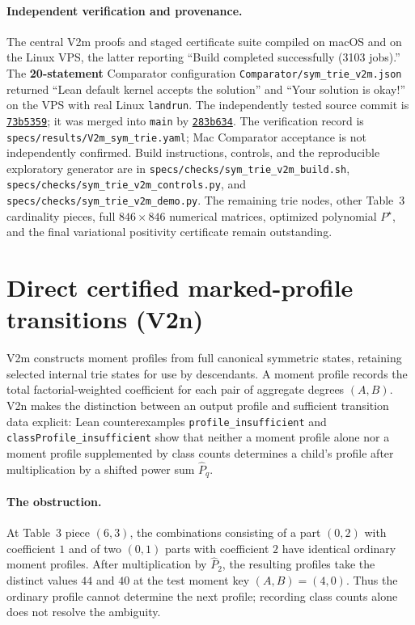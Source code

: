 \documentclass[11pt]{article}
\newcommand{\code}[1]{\texttt{#1}}
\begin{document}
\paragraph{Independent verification and provenance.}
The central V2m proofs and staged certificate suite compiled on macOS and
on the Linux VPS, the latter reporting
``Build completed successfully (3103 jobs).'' The \textbf{20-statement}
Comparator configuration \nolinkurl{Comparator/sym_trie_v2m.json} returned
``Lean default kernel accepts the solution'' and
``Your solution is okay!'' on the VPS with real Linux \code{landrun}.
The independently tested source commit is
\href{https://github.com/thinkthoughts/lean-bgp212/commit/73b5359}{\code{73b5359}};
it was merged into \code{main} by
\href{https://github.com/thinkthoughts/lean-bgp212/commit/283b634}{\code{283b634}}.
The verification record is
\nolinkurl{specs/results/V2m_sym_trie.yaml}; Mac Comparator acceptance is
not independently confirmed. Build instructions, controls, and the
reproducible exploratory generator are in
\nolinkurl{specs/checks/sym_trie_v2m_build.sh},
\nolinkurl{specs/checks/sym_trie_v2m_controls.py}, and
\nolinkurl{specs/checks/sym_trie_v2m_demo.py}.
The remaining trie nodes, other Table~3 cardinality pieces, full
$846\times846$ numerical matrices, optimized polynomial $P^\star$, and
the final variational positivity certificate remain outstanding.

\section{Direct certified marked-profile transitions (V2n)}\label{sec:v2n}
V2m constructs moment profiles from full canonical symmetric states, retaining
selected internal trie states for use by descendants. A moment profile records
the total factorial-weighted coefficient for each pair of aggregate degrees
$(A,B)$. V2n makes the distinction between an output profile and sufficient
transition data explicit: Lean counterexamples \code{profile\_insufficient} and
\code{classProfile\_insufficient} show that neither a moment profile alone nor
a moment profile supplemented by class counts determines a child's profile
after multiplication by a shifted power sum $\widehat P_q$.

\paragraph{The obstruction.}
At Table~3 piece $(6,3)$, the combinations consisting of a part $(0,2)$
with coefficient $1$ and of two $(0,1)$ parts with coefficient $2$ have
identical ordinary moment profiles. After multiplication by $\widehat P_2$,
the resulting profiles take the distinct values $44$ and $40$ at the test
moment key $(A,B)=(4,0)$. Thus the ordinary profile cannot determine the
next profile; recording class counts alone does not resolve the ambiguity.
\end{document}
